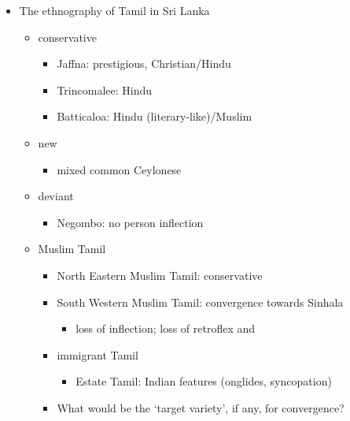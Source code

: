 \documentclass[a4paper,utf8]{article}
\begin{document}
\begin{itemize}
\item The ethnography of Tamil in Sri Lanka
  \begin{itemize}
  \item conservative
    \begin{itemize}
    \item Jaffna: prestigious, Christian/Hindu \citep{Zvelebil1959II,Kuiper1962,Pillai1962,Zvelebil1966,GairEtAl1979textbook,Gairdonotuse}
    \item Trincomalee: Hindu  \citep{Zvelebil1959I,Zvelebil1966}
    \item Batticaloa:  Hindu (literary-like)/Muslim \citep{Zvelebil1966,Batticaloa}
    \end{itemize}
  \item new
    \begin{itemize}
      \item mixed common Ceylonese \citep{Zvelebil1959II,Zvelebil1966}
    \end{itemize}
  \item deviant
      \begin{itemize}
      \item Negombo: no person inflection \citep{Bonta2004,Bonta2008}
      \end{itemize} 
 \item Muslim Tamil \citep{Nuhman2007}
\begin{itemize}
 \item North Eastern Muslim Tamil: conservative
 \item South Western Muslim Tamil: convergence towards Sinhala
 \begin{itemize}
  \item loss of inflection; loss of retroflex \nz{} and \lz{} \citep{Nuhman2007}
 \end{itemize}
 \item immigrant Tamil  
 \begin{itemize}
  \item Estate Tamil: Indian features (onglides, syncopation) \citep{Gairdonotuse,Wijeratne2005}
 \end{itemize}
\item What would be the `target variety', if any, for convergence?
\end{itemize}
\end{itemize}
\end{itemize}

\end{document}
